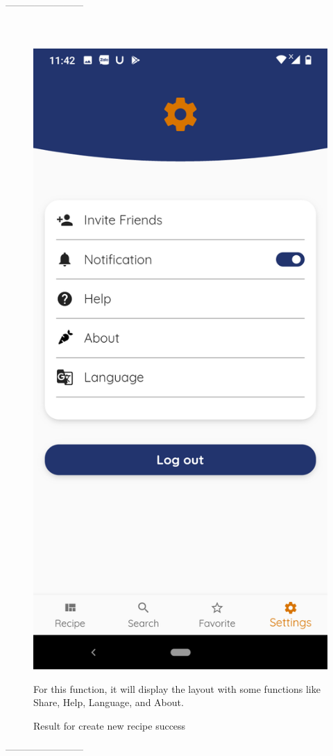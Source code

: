 \documentclass{article}
\begin{document}
           ------------------------\\ \\ \\
        \begin{figure}[h!]
        \centering
        \includegraphics[scale=0.1]{Images/Settings.jpg}
        \caption{Result for create new recipe success}
        For this function, it will display the layout with some functions like Share, Help, Language, and About.
        \label{fig:cookingbook}
        \end{figure}
          ------------------------\\ \\ \\ 
\end{document}
